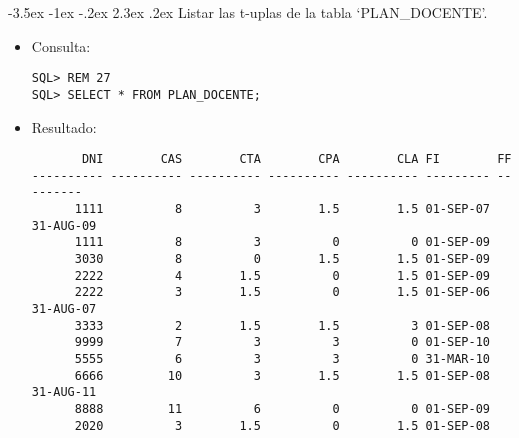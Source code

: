 \documentclass[11pt]{report}
\makeatletter
\renewcommand\chapter{\@startsection{chapter}{0}{\z@}%
    {-3.5ex \@plus -1ex \@minus -.2ex}%
    {2.3ex \@plus.2ex}%
    {\normalfont\Large\bfseries}}
\makeatother
\begin{document}
\chapter{Listar las t-uplas de la tabla ‘PLAN\_DOCENTE’.}
\begin{itemize}
  \item Consulta:
  \begin{verbatim}
SQL> REM 27
SQL> SELECT * FROM PLAN_DOCENTE;
  \end{verbatim}
  \item{Resultado:}
  \begin{verbatim}
       DNI        CAS        CTA        CPA        CLA FI        FF                                                                                                                                     
---------- ---------- ---------- ---------- ---------- --------- ---------                                                                                                                              
      1111          8          3        1.5        1.5 01-SEP-07 31-AUG-09                                                                                                                              
      1111          8          3          0          0 01-SEP-09                                                                                                                                        
      3030          8          0        1.5        1.5 01-SEP-09                                                                                                                                        
      2222          4        1.5          0        1.5 01-SEP-09                                                                                                                                        
      2222          3        1.5          0        1.5 01-SEP-06 31-AUG-07                                                                                                                              
      3333          2        1.5        1.5          3 01-SEP-08                                                                                                                                        
      9999          7          3          3          0 01-SEP-10                                                                                                                                        
      5555          6          3          3          0 31-MAR-10                                                                                                                                        
      6666         10          3        1.5        1.5 01-SEP-08 31-AUG-11                                                                                                                              
      8888         11          6          0          0 01-SEP-09                                                                                                                                        
      2020          3        1.5          0        1.5 01-SEP-08                                                                                                                                        


\end{verbatim}
\end{itemize}
\end{document}

